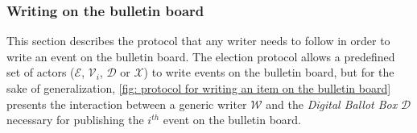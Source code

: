 \subsubsection{Writing on the bulletin board} \label{sec: writing on the bulletin board}
This section describes the protocol that any writer needs to follow in order to write an event on the bulletin board. The election protocol allows a predefined set of actors ($\mathcal{E}$, $\mathcal{V}_i$, $\mathcal{D}$ or $\mathcal{X}$) to write events on the bulletin board, but for the sake of generalization, \cref{fig: protocol for writing an item on the bulletin board} presents the interaction between a generic writer $\mathcal{W}$ and the \textit{Digital Ballot Box} $\mathcal{D}$ necessary for publishing the $i^{th}$ event on the bulletin board.

\begin{figure}[ht]
    \centering
\end{figure}
